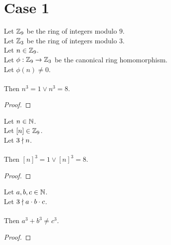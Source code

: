
\chapter*{Case 1}

\begin{lemma}
  \label{lmm:cube_of_castHom_ne_zero}
  \leanok
  Let $\mathbb{Z}_9$ be the ring of integers modulo $9$. \\
  Let $\mathbb{Z}_3$ be the ring of integers modulo $3$. \\
  Let $n \in \mathbb{Z}_9$. \\
  Let $\phi : \mathbb{Z}_9 \to \mathbb{Z}_3$ be the canonical ring homomorphism. \\
  Let $\phi(n) \neq 0$. \\ \\
  Then $n^3=1 \lor n^3=8$.
\end{lemma}
\begin{proof}
  \leanok
\end{proof}

\begin{lemma}
  \label{lmm:cube_of_not_dvd}
  \leanok
  Let $n \in \mathbb{N}$. \\
  Let $\left[n \right] \in \mathbb{Z}_9$. \\
  Let $3 \nmid n$. \\ \\
  Then $\left[n \right]^3 = 1 \lor \left[n \right]^3 = 8$.
\end{lemma}
\begin{proof}
  \leanok
\end{proof}

\begin{theorem}
    \label{thm:fermatLastTheoremThree_case_1}
    \leanok
    Let $a, b, c \in \mathbb{N}$. \\
    Let $3 \nmid a \cdot b \cdot c$. \\\\
    Then $a ^ 3 + b ^ 3 \neq c ^ 3$.
\end{theorem}
\begin{proof}
  \leanok
\end{proof}

